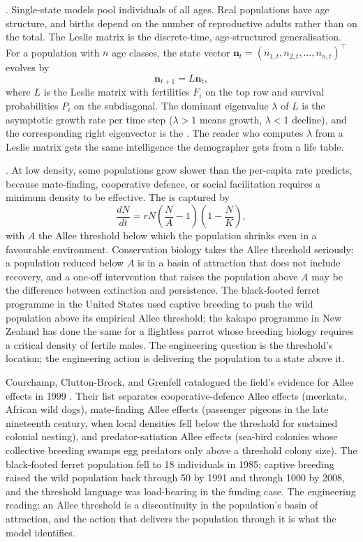 . Single-state models pool
individuals of all ages. Real populations have age structure, and
births depend on the number of reproductive adults rather than on
the total. The Leslie matrix \cite[ch.~5]{text:v6c08-caswell-matrix-models}
is the discrete-time, age-structured generalisation. For a population
with $n$ age classes, the state vector $\mathbf{n}_t = (n_{1,t},
n_{2,t}, \ldots, n_{n,t})^\top$ evolves by
\[
\mathbf{n}_{t+1} = L \mathbf{n}_t,
\]
where $L$ is the Leslie matrix with fertilities $F_i$ on the top row
and survival probabilities $P_i$ on the subdiagonal. The dominant
eigenvalue $\lambda$ of $L$ is the asymptotic growth rate per time
step ($\lambda > 1$ means growth, $\lambda < 1$ decline), and the
corresponding right eigenvector is the . The reader who computes $\lambda$ from a Leslie
matrix gets the same intelligence the demographer gets from a life
table.

. At low density, some populations grow
slower than the per-capita rate predicts, because mate-finding,
cooperative defence, or social facilitation requires a minimum density
to be effective. The  is captured by
\[
\frac{dN}{dt} = r N \left(\frac{N}{A} - 1\right)\left(1 - \frac{N}{K}\right),
\]
with $A$ the Allee threshold below which the population shrinks even
in a favourable environment. Conservation biology takes the Allee
threshold seriously: a population reduced below $A$ is in a basin of
attraction that does not include recovery, and a one-off intervention
that raises the population above $A$ may be the difference between
extinction and persistence. The black-footed ferret programme in the
United States used captive breeding to push the wild population
above its empirical Allee threshold; the kakapo programme in New
Zealand has done the same for a flightless parrot whose breeding
biology requires a critical density of fertile males. The engineering
question is the threshold's location; the engineering action is
delivering the population to a state above it.

Courchamp, Clutton-Brock, and Grenfell catalogued the field's
evidence for Allee effects in 1999 \cite[pp.~405--410]{paper:v6c08-courchamp-allee-1999}.
Their list separates cooperative-defence Allee effects (meerkats,
African wild dogs), mate-finding Allee effects (passenger pigeons in
the late nineteenth century, when local densities fell below the
threshold for sustained colonial nesting), and predator-satiation
Allee effects (sea-bird colonies whose collective breeding swamps
egg predators only above a threshold colony size). The black-footed
ferret population fell to 18 individuals in 1985; captive breeding
raised the wild population back through 50 by 1991 and through 1000
by 2008, and the threshold language was load-bearing in the funding
case. The engineering reading: an Allee threshold is a discontinuity
in the population's basin of attraction, and the action that delivers
the population through it is what the model identifies.

